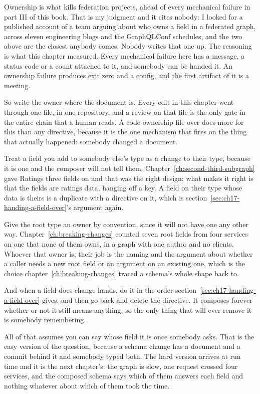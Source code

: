 %
Ownership is what kills federation projects, ahead of every mechanical failure
in part III of this book. That is my judgment and it cites nobody: I looked
for a published account of a team arguing about who owns a field in a
federated graph, across eleven engineering blogs and the GraphQLConf
schedules, and the two above are the closest anybody comes. Nobody writes that
one up. The reasoning is what this chapter measured. Every mechanical failure
here has a message, a status code or a count attached to it, and somebody can
be handed it. An ownership failure produces exit zero and a config, and the
first artifact of it is a meeting.

%
So write the owner where the document is. Every edit in this chapter went
through one file, in one repository, and a review on that file is the only
gate in the entire chain that a human reads. A code-ownership file over
 does more for this than any directive, because it is the
one mechanism that fires on the thing that actually happened: somebody changed
a document.

%
Treat a field you add to somebody else's type as a change to their type,
because it is one and the composer will not tell them.
Chapter~\ref{ch:second-third-subgraph} gave Ratings three fields on
 and that was the right design; what makes it right is that the
fields are ratings data, hanging off a key. A field on their type whose data
is theirs is a duplicate with a directive on it, which is
section~\ref{sec:ch17-handing-a-field-over}'s  argument again.

%
Give the root type an owner by convention, since it will not have one any
other way. Chapter~\ref{ch:breaking-changes} counted seven root fields from
four services on one  that none of them owns, in a graph with one
author and no clients. Whoever that owner is, their job is the naming and the
argument about whether a caller needs a new root field or an argument on an
existing one, which is the choice chapter~\ref{ch:breaking-changes} traced a
schema's whole shape back to.

%
And when a field does change hands, do it in the order
section~\ref{sec:ch17-handing-a-field-over} gives, and then go back and delete
the directive. It composes forever whether or not it still means anything, so
the only thing that will ever remove it is somebody remembering.

%
All of that assumes you can say whose field it is once somebody asks. That is
the easy version of the question, because a schema change has a document and a
commit behind it and somebody typed both. The hard version arrives at run time
and it is the next chapter's: the graph is slow, one request crossed four
services, and the composed schema says which of them answers each field and
nothing whatever about which of them took the time.
%
